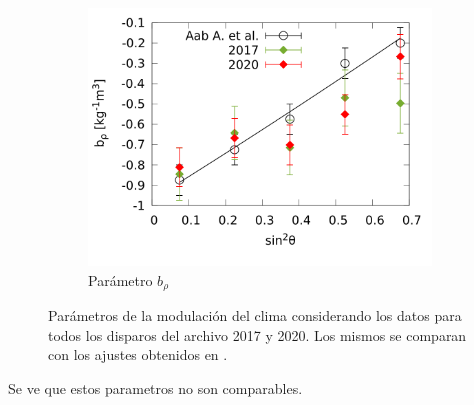 \begin{figure}[H]
\begin{subfigure}[b]{\textwidth}
					\centering
					\includegraphics[width=0.5\linewidth]{params/brho_2017_2020_above_1EeV.png}
					\caption{Parámetro  $b_\rho$	 }
					\end{subfigure}%
					\caption{Parámetros de la modulación del clima considerando los datos para todos los disparos del archivo 2017 y 2020. Los mismos se comparan con los ajustes obtenidos en \cite{aab2017impact}.}
				\end{figure}

			Se ve que estos parametros no son comparables. 







